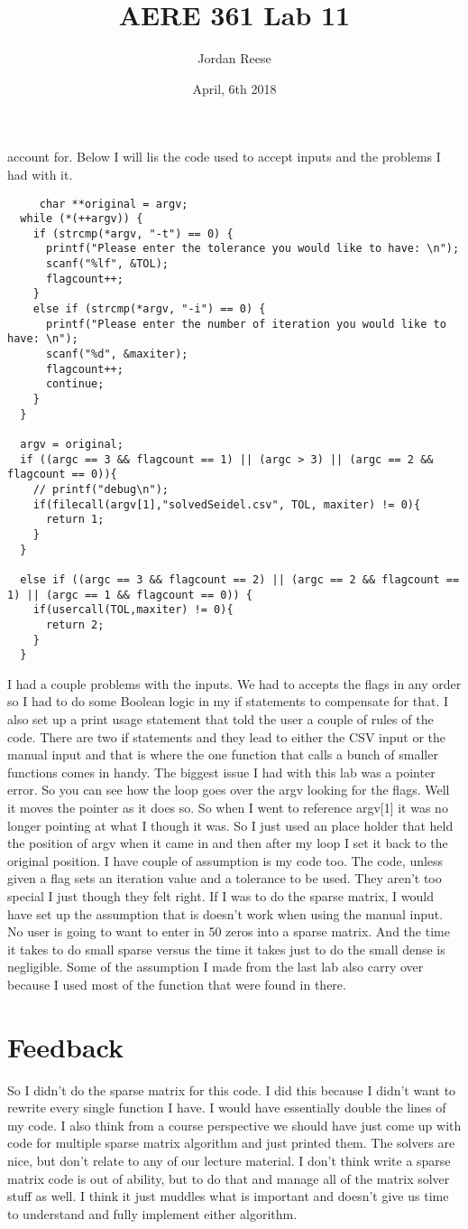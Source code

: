 \documentclass{article} \usepackage[utf8]{inputenc} \title{AERE 361 Lab 11} \author{Jordan Reese} \date{April, 6th 2018} \usepackage{listings} \usepackage{color} \definecolor{dkgreen}{rgb}{0,0.6,0}
\begin{document}
account for. Below I will lis the code used to accept inputs and the problems I had with it. \begin{lstlisting}
     char **original = argv;
  while (*(++argv)) {
    if (strcmp(*argv, "-t") == 0) {
      printf("Please enter the tolerance you would like to have: \n");
      scanf("%lf", &TOL);
      flagcount++;
    }
    else if (strcmp(*argv, "-i") == 0) {
      printf("Please enter the number of iteration you would like to have: \n");
      scanf("%d", &maxiter);
      flagcount++;
      continue;
    }
  }
  
  argv = original;
  if ((argc == 3 && flagcount == 1) || (argc > 3) || (argc == 2 && flagcount == 0)){
    // printf("debug\n");
    if(filecall(argv[1],"solvedSeidel.csv", TOL, maxiter) != 0){
      return 1;
    }
  }
  
  else if ((argc == 3 && flagcount == 2) || (argc == 2 && flagcount == 1) || (argc == 1 && flagcount == 0)) {
    if(usercall(TOL,maxiter) != 0){
      return 2;
    }
  }
\end{lstlisting} I had a couple problems with the inputs. We had to accepts the flags in any order so I had to do some Boolean logic in my if statements to compensate for that. I also set up a print usage statement that told the 
user a couple of rules of the code. There are two if statements and they lead to either the CSV input or the manual input and that is where the one function that calls a bunch of smaller functions comes in handy. The biggest 
issue I had with this lab was a pointer error. So you can see how the loop goes over the argv looking for the flags. Well it moves the pointer as it does so. So when I went to reference argv[1] it was no longer pointing at what I 
though it was. So I just used an place holder that held the position of argv when it came in and then after my loop I set it back to the original position. I have couple of assumption is my code too. The code, unless given a flag 
sets an iteration value and a tolerance to be used. They aren't too special I just though they felt right. If I was to do the sparse matrix, I would have set up the assumption that is doesn't work when using the manual input. No 
user is going to want to enter in 50 zeros into a sparse matrix. And the time it takes to do small sparse versus the time it takes just to do the small dense is negligible. Some of the assumption I made from the last lab also 
carry over because I used most of the function that were found in there. \section*{Feedback} So I didn't do the sparse matrix for this code. I did this because I didn't want to rewrite every single function I have. I would have 
essentially double the lines of my code. I also think from a course perspective we should have just come up with code for multiple sparse matrix algorithm and just printed them. The solvers are nice, but don't relate to any of 
our lecture material. I don't think write a sparse matrix code is out of ability, but to do that and manage all of the matrix solver stuff as well. I think it just muddles what is important and doesn't give us time to understand 
and fully implement either algorithm. 
\end{document}

